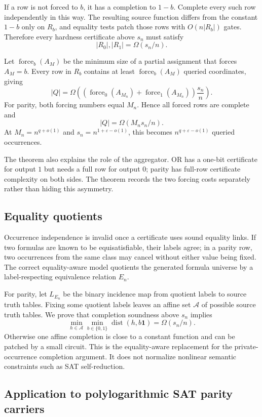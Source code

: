 \documentclass[11pt]{article}
\theoremstyle{definition}
\newcommand{\bits}{\{0,1\}}
\newcommand{\dist}{\operatorname{dist}}
\newcommand{\Force}{\operatorname{force}}
\newcommand{\eps}{\varepsilon}
\begin{document}
If a row is not forced to $b$, it has a completion to $1-b$.  Complete every such row independently in this way.  The resulting source function differs from the constant $1-b$ only on $R_b$, and equality tests patch those rows with $O(n|R_b|)$ gates.  Therefore every hardness certificate above $s_n$ must satisfy
\[
  |R_0|,|R_1|=\Omega(s_n/n).
\]

Let $\Force_b(A_M)$ be the minimum size of a partial assignment that forces $A_M=b$.  Every row in $R_b$ contains at least $\Force_b(A_M)$ queried coordinates, giving
\[
  |Q|=\Omega\!\left(
      (\Force_0(A_{M_n})+\Force_1(A_{M_n}))\frac{s_n}{n}
    \right).
\]
For parity, both forcing numbers equal $M_n$.  Hence all forced rows are complete and
\[
  |Q|=\Omega(M_ns_n/n).
\]
At $M_n=n^{q+o(1)}$ and $s_n=n^{1+\eps-o(1)}$, this becomes $n^{q+\eps-o(1)}$ queried occurrences.

The theorem also explains the role of the aggregator.  OR has a one-bit certificate for output $1$ but needs a full row for output $0$; parity has full-row certificate complexity on both sides.  The theorem records the two forcing costs separately rather than hiding this asymmetry.

\subsection{Equality quotients}

Occurrence independence is invalid once a certificate uses sound equality links.  If two formulas are known to be equisatisfiable, their labels agree; in a parity row, two occurrences from the same class may cancel without either value being fixed.  The correct equality-aware model quotients the generated formula universe by a label-respecting equivalence relation $E_n$.

For parity, let $L_{E_n}$ be the binary incidence map from quotient labels to source truth tables.  Fixing some quotient labels leaves an affine set $\mathcal A$ of possible source truth tables.  We prove that completion soundness above $s_n$ implies
\[
  \min_{h\in\mathcal A}\min_{b\in\bits}
  \dist(h,b\mathbf 1)
  =\Omega(s_n/n).
\]
Otherwise one affine completion is close to a constant function and can be patched by a small circuit.  This is the equality-aware replacement for the private-occurrence completion argument.  It does not normalize nonlinear semantic constraints such as SAT self-reduction.

\subsection{Application to polylogarithmic SAT parity carriers}
\end{document}
